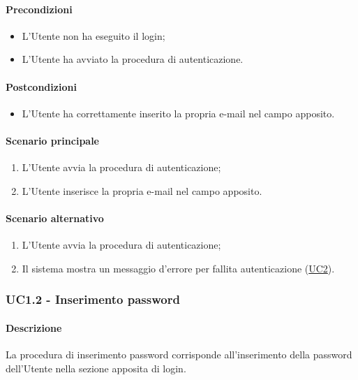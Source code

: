 \paragraph*{Precondizioni}
\begin{itemize}
  \item L’Utente non ha eseguito il login;
  \item L’Utente ha avviato la procedura di autenticazione.  
\end{itemize}

\paragraph*{Postcondizioni}
\begin{itemize}
  \item L’Utente ha correttamente inserito la propria e-mail nel campo apposito.
\end{itemize}

\paragraph*{Scenario principale}
\begin{enumerate}
  \item L’Utente avvia la procedura di autenticazione;
  \item L’Utente inserisce la propria e-mail nel campo apposito.  
\end{enumerate}

\paragraph*{Scenario alternativo}
\begin{enumerate}
  \item L'Utente avvia la procedura di autenticazione;
  \item Il sistema mostra un messaggio d'errore per fallita autenticazione (\hyperref[UC2]{UC2}).
\end{enumerate}


\subsubsection{UC1.2 - Inserimento password}\label{UC1point2}
\paragraph*{Descrizione}
La procedura di inserimento password corrisponde all’inserimento della password dell'Utente nella sezione apposita di login.


